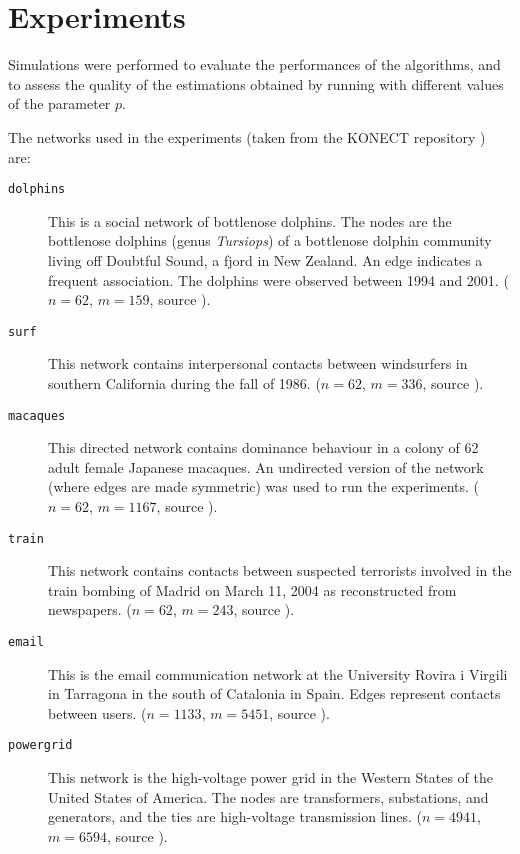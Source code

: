 
\section{Experiments}
\label{sec:exp}

Simulations were performed to evaluate the performances of the algorithms, and to assess the quality of the estimations obtained by running \multibfs{} with different values of the parameter $p$.

The networks used in the experiments (taken from the KONECT repository \cite{konect}) are:
\begin{description}
 \item[\texttt{dolphins}] This is a social network of bottlenose dolphins. The nodes are the bottlenose dolphins (genus \emph{Tursiops}) of a bottlenose dolphin community living off Doubtful Sound, a fjord in New Zealand. An edge indicates a frequent association. The dolphins were observed between 1994 and 2001. ($n=62$, $m=159$, source \cite{network:dolphins}).
 \item[\texttt{surf}] This network contains interpersonal contacts between windsurfers in southern California during the fall of 1986. ($n=62$, $m=336$, source \cite{network:surf}).
 \item[\texttt{macaques}] This directed network contains dominance behaviour in a colony of 62 adult female Japanese macaques. An undirected version of the network (where edges are made symmetric) was used to run the experiments. ($n=62$, $m=1167$, source \cite{network:mac}).
 \item[\texttt{train}] This network contains contacts between suspected terrorists involved in the train bombing of Madrid on March 11, 2004 as reconstructed from newspapers. ($n=62$, $m=243$, source \cite{network:train}).
 \item[\texttt{email}] This is the email communication network at the University Rovira i Virgili in Tarragona in the south of Catalonia in Spain. Edges represent contacts between users. ($n=1133$, $m=5451$, source \cite{network:email}).
 \item[\texttt{powergrid}] This network is the high-voltage power grid in the Western States of the United States of America. The nodes are transformers, substations, and generators, and the ties are high-voltage transmission lines. ($n=4941$, $m=6594$, source \cite{network:powergrid}).
\end{description}

